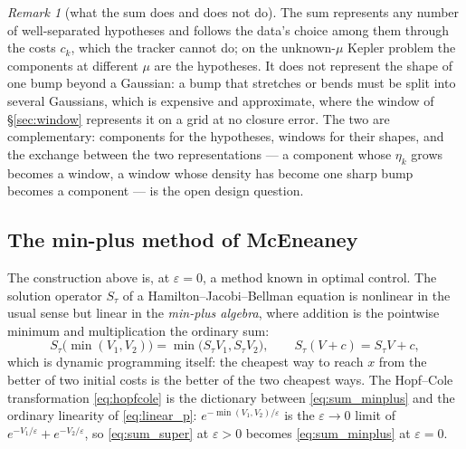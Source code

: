 \documentclass[11pt,a4paper]{article}
\newcommand{\eps}{\varepsilon}
\theoremstyle{plain}
\theoremstyle{definition}
\theoremstyle{remark}
\newtheorem{remark}{Remark}
\begin{document}
\begin{remark}[what the sum does and does not do]
The sum represents any number of well-separated hypotheses and follows the data's choice among them through the costs $c_k$, which the tracker cannot do; on the unknown-$\mu$ Kepler problem the components at different $\mu$ are the hypotheses. It does not represent the shape of one bump beyond a Gaussian: a bump that stretches or bends must be split into several Gaussians, which is expensive and approximate, where the window of \S\ref{sec:window} represents it on a grid at no closure error. The two are complementary: components for the hypotheses, windows for their shapes, and the exchange between the two representations --- a component whose $\eta_k$ grows becomes a window, a window whose density has become one sharp bump becomes a component --- is the open design question.
\end{remark}

\subsection{The min-plus method of McEneaney}
\label{sec:sum_mcen}

The construction above is, at $\eps=0$, a method known in optimal control. The solution operator $S_\tau$ of a Hamilton--Jacobi--Bellman equation is nonlinear in the usual sense but linear in the \emph{min-plus algebra}, where addition is the pointwise minimum and multiplication the ordinary sum:
\begin{equation}
  S_\tau\big(\min(V_1,V_2)\big) = \min\big(S_\tau V_1,S_\tau V_2\big), \qquad S_\tau(V+c) = S_\tau V + c ,
  \label{eq:sum_minplus}
\end{equation}
which is dynamic programming itself: the cheapest way to reach $x$ from the better of two initial costs is the better of the two cheapest ways. The Hopf--Cole transformation \eqref{eq:hopfcole} is the dictionary between \eqref{eq:sum_minplus} and the ordinary linearity of \eqref{eq:linear_p}: $e^{-\min(V_1,V_2)/\eps}$ is the $\eps\to0$ limit of $e^{-V_1/\eps}+e^{-V_2/\eps}$, so \eqref{eq:sum_super} at $\eps>0$ becomes \eqref{eq:sum_minplus} at $\eps=0$.
\end{document}
